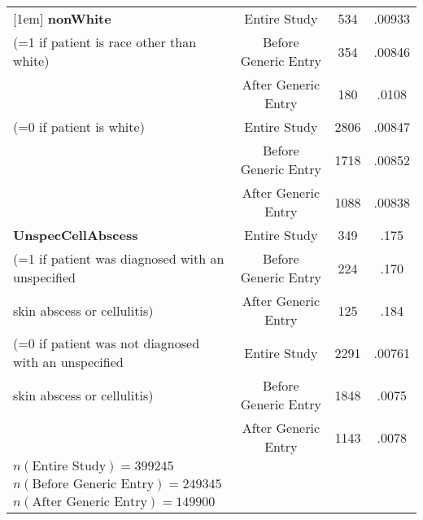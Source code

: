 \begin{table}[htbp]
\begin{tabular}{l*{3}{c}}
[1em]
\textbf{nonWhite}                                       &     Entire Study&             534&      .00933\\
(=1 if patient is race other than white)                &     Before Generic Entry&     354&      .00846\\
                                                        &     After Generic Entry&      180&      .0108\\
[1em]
(=0 if patient is white)                                &     Entire Study&             2806&      .00847\\
                                                        &     Before Generic Entry&     1718&      .00852\\
                                                        &     After Generic Entry&      1088&      .00838\\
[1em]
\textbf{UnspecCellAbscess}                              &     Entire Study&             349 &      .175\\
(=1 if patient was diagnosed with an unspecified        &     Before Generic Entry&     224 &      .170\\
 skin abscess or cellulitis)                            &     After Generic Entry&      125  &      .184\\
[1em]
(=0 if patient was not diagnosed with an unspecified    &     Entire Study&             2291 &      .00761\\
skin abscess or cellulitis)                             &     Before Generic Entry&     1848 &      .0075\\
                                                        &     After Generic Entry&      1143  &      .0078\\
\hline
$n(\text{Entire Study}) = 399245$\\
$n(\text{Before Generic Entry}) = 249345$\\
$n(\text{After Generic Entry}) = 149900$\\
\hline\hline
\end{tabular}
\label{tab:Table4.3}
\end{table}

